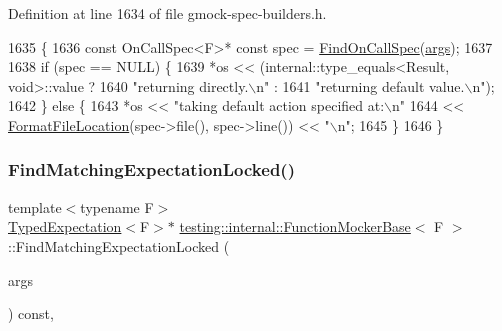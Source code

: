 Definition at line 1634 of file gmock-\/spec-\/builders.\+h.


\begin{DoxyCode}
1635                                                      \{
1636     \textcolor{keyword}{const} OnCallSpec<F>* \textcolor{keyword}{const} spec = \hyperlink{classtesting_1_1internal_1_1FunctionMockerBase_a3bcd2e8191ffc44bd59b8d8d25eefd3e}{FindOnCallSpec}(\hyperlink{namespacegenerate__debs_a75f9143e38df82d83b2e8a6f99cae02c}{args});
1637 
1638     \textcolor{keywordflow}{if} (spec == NULL) \{
1639       *os << (internal::type\_equals<Result, void>::value ?
1640               \textcolor{stringliteral}{"returning directly.\(\backslash\)n"} :
1641               \textcolor{stringliteral}{"returning default value.\(\backslash\)n"});
1642     \} \textcolor{keywordflow}{else} \{
1643       *os << \textcolor{stringliteral}{"taking default action specified at:\(\backslash\)n"}
1644           << \hyperlink{namespacetesting_1_1internal_a31b7c3abed4a7c395f42c61e993989f4}{FormatFileLocation}(spec->file(), spec->line()) << \textcolor{stringliteral}{"\(\backslash\)n"};
1645     \}
1646   \}
\end{DoxyCode}
\mbox{\label{classtesting_1_1internal_1_1FunctionMockerBase_a236b019bcbbfd13c0ed25aa34c1dd344}} 
\subsubsection{\texorpdfstring{Find\+Matching\+Expectation\+Locked()}{FindMatchingExpectationLocked()}}
{\footnotesize\ttfamily template$<$typename F$>$ \\
\hyperlink{classtesting_1_1internal_1_1TypedExpectation}{Typed\+Expectation}$<$F$>$$\ast$ \hyperlink{classtesting_1_1internal_1_1FunctionMockerBase}{testing\+::internal\+::\+Function\+Mocker\+Base}$<$ F $>$\+::Find\+Matching\+Expectation\+Locked (\begin{DoxyParamCaption}\item[{const \hyperlink{classtesting_1_1internal_1_1FunctionMockerBase_a336432a07e544af4ffb8103603471ca3}{Argument\+Tuple} \&}]{args }\end{DoxyParamCaption}) const\hspace{0.3cm}{\ttfamily [inline]}, {\ttfamily [private]}}



